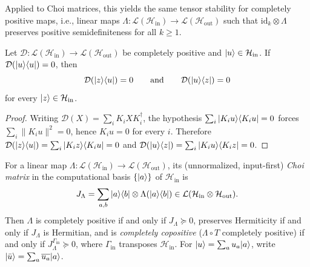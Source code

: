 Applied to Choi matrices, this yields the same tensor stability for completely positive maps, i.e., linear maps $\Lambda : \mathcal{L}(\mathcal{H}_{\mathrm{in}}) \to \mathcal{L}(\mathcal{H}_{\mathrm{out}})$ such that $\mathrm{id}_k\otimes\Lambda$ preserves positive semidefiniteness for all $k\ge 1$.

\begin{lemma}
\label{lem:cp-agreement}
\leanok
Let $\mathcal{D} : \mathcal{L}(\mathcal{H}_{\mathrm{in}}) \to \mathcal{L}(\mathcal{H}_{\mathrm{out}})$ be completely positive and $|u\rangle\in\mathcal{H}_{\mathrm{in}}$. If $\mathcal{D}(|u\rangle\langle u|) = 0$, then
\[
  \mathcal{D}(|z\rangle\langle u|) = 0 \qquad\text{and}\qquad \mathcal{D}(|u\rangle\langle z|) = 0
\]
for every $|z\rangle\in\mathcal{H}_{\mathrm{in}}$.
\end{lemma}
\begin{proof}
\leanok
Writing $\mathcal{D}(X) = \sum_i K_i X K_i^{\dagger}$, the hypothesis $\sum_i |K_i u\rangle\langle K_i u| = 0$ forces $\sum_i \|K_i u\|^2 = 0$, hence $K_i u = 0$ for every $i$. Therefore $\mathcal{D}(|z\rangle\langle u|) = \sum_i |K_i z\rangle\langle K_i u| = 0$ and $\mathcal{D}(|u\rangle\langle z|) = \sum_i |K_i u\rangle\langle K_i z| = 0$.
\end{proof}

For a linear map $\Lambda : \mathcal{L}(\mathcal{H}_{\mathrm{in}}) \to \mathcal{L}(\mathcal{H}_{\mathrm{out}})$, its (unnormalized, input-first) \emph{Choi matrix} in the computational basis $\{|a\rangle\}$ of $\mathcal{H}_{\mathrm{in}}$ is
\[
  J_\Lambda = \sum_{a,b} |a\rangle\langle b|\otimes\Lambda(|a\rangle\langle b|)
  \in \mathcal{L}(\mathcal{H}_{\mathrm{in}}\otimes\mathcal{H}_{\mathrm{out}}).
\]
Then $\Lambda$ is completely positive if and only if $J_\Lambda\succeq 0$, preserves Hermiticity if and only if $J_\Lambda$ is Hermitian, and is \emph{completely copositive} ($\Lambda\circ T$ completely positive) if and only if $J_\Lambda^{\Gamma_{\mathrm{in}}}\succeq 0$, where $\Gamma_{\mathrm{in}}$ transposes $\mathcal{H}_{\mathrm{in}}$. For $|u\rangle = \sum_a u_a|a\rangle$, write $|\bar{u}\rangle = \sum_a \overline{u_a}|a\rangle$.

